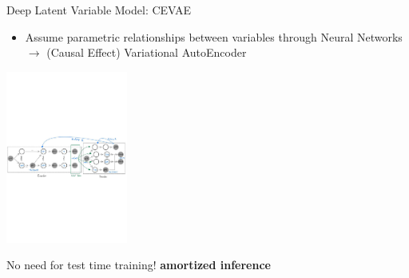 \documentclass[10pt]{beamer}
\begin{document}
  \begin{frame}{Deep Latent Variable Model: CEVAE}
     \begin{itemize}
         \item Assume parametric relationships between variables through \alert{Neural Networks} $\rightarrow$ (Causal Effect) Variational AutoEncoder
     \end{itemize}
    \begin{center}
  \includegraphics[width=0.3\textwidth]{images/cevae_architecture.pdf}
\end{center}
    No need for test time training! \textbf{amortized inference}

 \end{frame}
\end{document}
